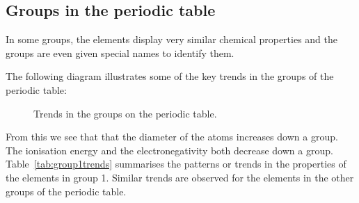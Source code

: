 \subsection*{Groups in the periodic table}
            \nopagebreak
            \label{m38760*id261554} In some groups, the elements display very similar chemical properties and the groups are even given special names to identify them.\par 
        \label{m38760*id261833}The following diagram illustrates some of the key trends in the groups of the periodic table: \\
\begin{figure}[H]

\begin{center}
\end{center}
\caption{Trends in the groups on the periodic table.}
\label{fig:atom:periodic1}
 \end{figure} 
From this we see that that the diameter of the atoms increases down a group. The ionisation energy and the electronegativity both decrease down a group. \\
Table~\ref{tab:group1trends} summarises the patterns or trends in the properties of the elements in group 1. Similar trends are observed for the elements in the other groups of the periodic table. \\
